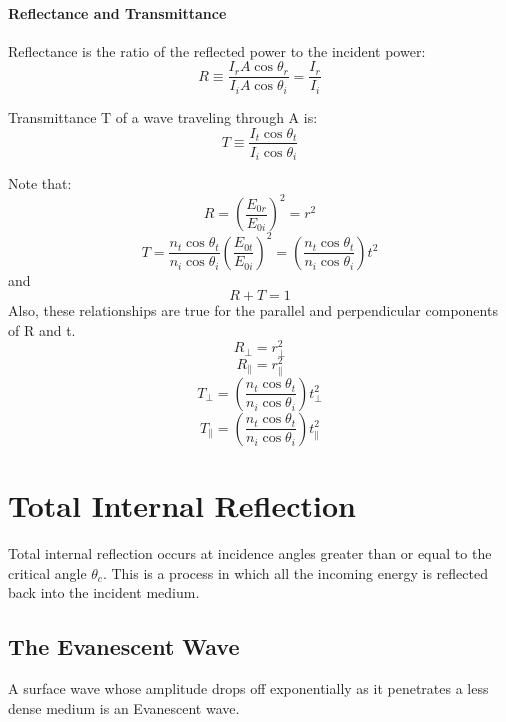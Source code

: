 \documentclass[12pt]{report}
\begin{document}
\paragraph{Reflectance and Transmittance}
Reflectance is the ratio of the reflected power to the incident power:
\[R \equiv \frac{I_r A \cos \theta_r}{I_i A \cos \theta_i} = \frac{I_r}{I_i}\]

Transmittance T of a wave traveling through A is: 
\[T \equiv \frac{I_t \cos\theta_t}{I_i \cos\theta_i}\]

Note that:
\[R = \left(\frac{E_{0r}}{E_{0i}}\right)^2 = r^2\]
\[T = \frac{n_t \cos \theta_t}{n_i \cos \theta_i}\left(\frac{E_{0t}}{E_{0i}}\right)^2 = \left(\frac{n_t \cos \theta_t}{n_i \cos \theta_i}\right)t^2\]
and
\[R+T = 1\]
Also, these relationships are true for the parallel and perpendicular components of R and t. 
\[R_\perp = r_\perp^2\]
\[R_\parallel = r_\parallel^2\]
\[T_\perp = \left(\frac{n_t \cos \theta_t}{n_i \cos \theta_i}\right)t_\perp^2\]
\[T_\parallel = \left(\frac{n_t \cos \theta_t}{n_i \cos \theta_i}\right)t_\parallel^2\]
\section{Total Internal Reflection}
Total internal reflection occurs at incidence angles greater than or equal to the critical angle $\theta_c$. This is a process in which all the incoming energy is reflected back into the incident medium. 
\subsection{The Evanescent Wave}
A surface wave whose amplitude drops off exponentially as it penetrates a less dense medium is an Evanescent wave. 
\end{document}
